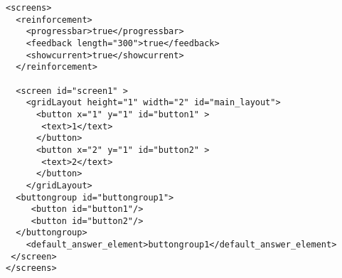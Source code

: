 

















\begin{lstlisting}
<screens>
  <reinforcement>
    <progressbar>true</progressbar>
    <feedback length="300">true</feedback>
    <showcurrent>true</showcurrent>
  </reinforcement>

  <screen id="screen1" >
    <gridLayout height="1" width="2" id="main_layout">
      <button x="1" y="1" id="button1" >
       <text>1</text>
      </button>
      <button x="2" y="1" id="button2" >
       <text>2</text>
      </button>
    </gridLayout>
  <buttongroup id="buttongroup1">
     <button id="button1"/>
     <button id="button2"/>
  </buttongroup>
    <default_answer_element>buttongroup1</default_answer_element>
 </screen>
</screens>
\end{lstlisting}

